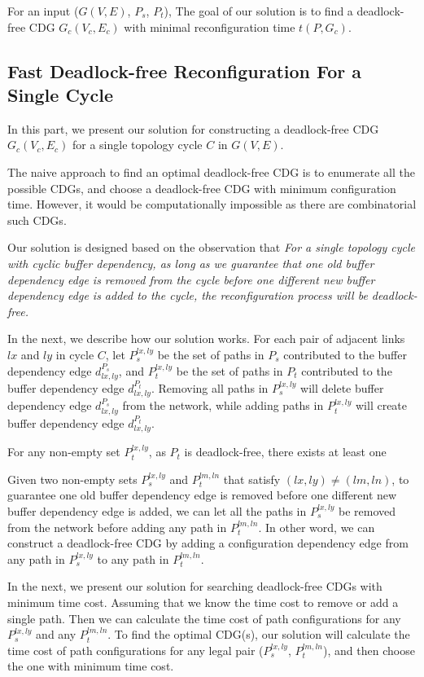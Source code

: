 For an input ($G(V,E)$, $P_s$, $P_t$), The goal of our solution is to find a deadlock-free CDG $G_c(V_c,E_c)$ with minimal reconfiguration time $t(P, G_c)$.

\subsection{Fast Deadlock-free Reconfiguration For a Single Cycle}\label{subsec:dfrforsc}



In this part, we present our solution for constructing a deadlock-free CDG $G_c(V_c,E_c)$ for a single topology cycle $C$ in $G(V,E)$. 

The naive approach to find an optimal deadlock-free CDG is to enumerate all the possible CDGs, and choose a deadlock-free CDG with minimum configuration time. However, it would be computationally impossible as there are combinatorial such CDGs. 

Our solution is designed based on the observation that \textit{For a single topology cycle with cyclic buffer dependency, as long as we guarantee that one old buffer dependency edge is removed from the cycle before one different new buffer dependency edge is added to the cycle, the reconfiguration process will be deadlock-free.} 

In the next, we describe how our solution works. For each pair of adjacent links $lx$ and $ly$ in cycle $C$, let $P_s^{lx,ly}$ be the set of paths in $P_s$ contributed to the buffer dependency edge $d_{lx,ly}^{P_s}$, and $P_t^{lx,ly}$ be the set of paths in $P_t$ contributed to the buffer dependency edge $d_{lx,ly}^{P_t}$. Removing all paths in $P_s^{lx,ly}$ will delete buffer dependency edge $d_{lx,ly}^{P_s}$ from the network, while adding paths in $P_t^{lx,ly}$ will create buffer dependency edge $d_{lx,ly}^{P_t}$.


For any non-empty set $P_t^{lx,ly}$, as $P_t$ is deadlock-free, there exists at least one 

Given two non-empty sets $P_s^{lx,ly}$ and $P_t^{lm,ln}$ that satisfy $(lx, ly) \neq (lm, ln)$, to guarantee one old buffer dependency edge is removed before one different new buffer dependency edge is added, we can let all the paths in $P_s^{lx,ly}$ be removed from the network before adding any path in $P_t^{lm,ln}$. In other word, we can construct a deadlock-free CDG by adding a configuration dependency edge from any path in $P_s^{lx,ly}$ to any path in $P_t^{lm,ln}$.

In the next, we present our solution for searching deadlock-free CDGs with minimum time cost.  Assuming that we know the time cost to remove or add a single path. Then we can calculate the time cost of path configurations for any $P_s^{lx,ly}$ and any $P_t^{lm,ln}$. To find the optimal CDG(s), our solution will calculate the time cost of path configurations for any legal pair ($P_s^{lx,ly}$, $P_t^{lm,ln}$), and then choose the one with minimum time cost. 

